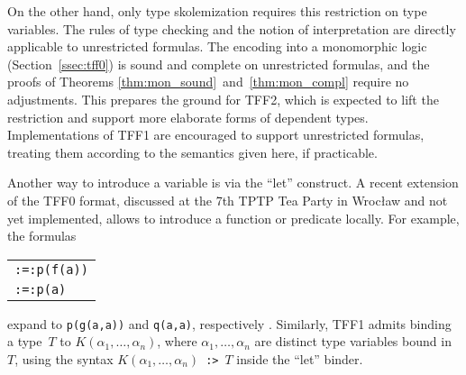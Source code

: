 On the other hand, only type skolemization requires this restriction on type
variables. The rules of type checking and the notion of interpretation are
directly applicable to unrestricted formulas. The encoding into a monomorphic
logic (Section~\ref{ssec:tff0}) is sound and complete on unrestricted formulas,
and the proofs of Theorems \ref{thm:mon_sound}~and~\ref{thm:mon_compl}
require no adjustments. This prepares the ground for TFF2, which is expected to lift the
restriction and support more elaborate forms of dependent types. Implementations
of TFF1 are encouraged to support unrestricted formulas, treating them according
to the semantics given here, if practicable.

Another way to introduce a variable is via the ``let'' construct.
A recent extension of the TFF0 format, discussed at the 7th TPTP Tea Party in
Wrocław and not yet implemented, allows to introduce a function or predicate
locally. For example, the formulas
\begin{center}
\begin{tabular}{l}
{\tt :=\;[X\;:\;\$int,\;f(X)\;=\;g(X,\;X)]:\;p(f(a))} \\[\smallskipamount]
{\tt :=\;[X\;:\;\$int,\;p(X)\;<=>\;q(X,\;X)]:\;p(a)}
\end{tabular}
\end{center}
expand to {\tt p(g(a,\;a))} and {\tt q(a,\;a)}, respectively
\cite{geoff-tptptp-notes}.
Similarly, TFF1 admits binding a type~$T$ to $K(\alpha_1, \ldots,
\alpha_n)$, where $\alpha_1, \ldots, \alpha_n$ are distinct type variables bound
in $T$, using the syntax $K(\alpha_1, \ldots, \alpha_n)$~{\tt :>}~$T$ inside
the ``let'' binder.
%
%
%
